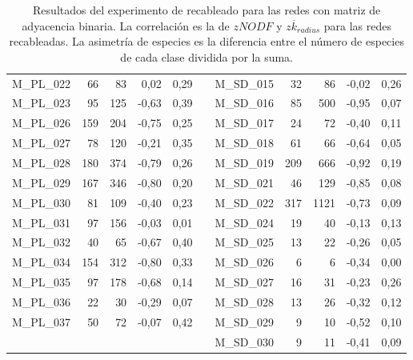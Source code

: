 \begin{table}[ht!]
\begin{tabular}{lrrrrrlrrrr}
    M\_PL\_022 & 66   & 83   & 0,02 & 0,29 &      & M\_SD\_015 & 32   & 86   & -0,02 & 0,26 \\
    M\_PL\_023 & 95   & 125  & -0,63 & 0,39 &      & M\_SD\_016 & 85   & 500  & -0,95 & 0,07 \\
    M\_PL\_026 & 159  & 204  & -0,75 & 0,25 &      & M\_SD\_017 & 24   & 72   & -0,40 & 0,11 \\
    M\_PL\_027 & 78   & 120  & -0,21 & 0,35 &      & M\_SD\_018 & 61   & 66   & -0,64 & 0,05 \\
    M\_PL\_028 & 180  & 374  & -0,79 & 0,26 &      & M\_SD\_019 & 209  & 666  & -0,92 & 0,19 \\
    M\_PL\_029 & 167  & 346  & -0,80 & 0,20 &      & M\_SD\_021 & 46   & 129  & -0,85 & 0,08 \\
    M\_PL\_030 & 81   & 109  & -0,40 & 0,23 &      & M\_SD\_022 & 317  & 1121 & -0,73 & 0,09 \\
    M\_PL\_031 & 97   & 156  & -0,03 & 0,01 &      & M\_SD\_024 & 19   & 40   & -0,13 & 0,13 \\
    M\_PL\_032 & 40   & 65   & -0,67 & 0,40 &      & M\_SD\_025 & 13   & 22   & -0,26 & 0,05 \\
    M\_PL\_034 & 154  & 312  & -0,80 & 0,33 &      & M\_SD\_026 & 6    & 6    & -0,34 & 0,00 \\
    M\_PL\_035 & 97   & 178  & -0,68 & 0,14 &      & M\_SD\_027 & 16   & 31   & -0,23 & 0,26 \\
    M\_PL\_036 & 22   & 30   & -0,29 & 0,07 &      & M\_SD\_028 & 13   & 26   & -0,32 & 0,12 \\
    M\_PL\_037 & 50   & 72   & -0,07 & 0,42 &      & M\_SD\_029 & 9    & 10   & -0,52 & 0,10 \\
         &      &      &      &      &      & M\_SD\_030 & 9    & 11   & -0,41 & 0,09 \\
    \bottomrule
    \end{tabular}%
    \caption{\label{table:table_results_recableados} Resultados del experimento de recableado para las redes con matriz de adyacencia binaria. La correlación es la de $zNODF$ y $z \overline {k}_{radius}$ para las redes recableadas. La asimetría de especies es la diferencia entre el número de especies de cada clase dividida por la suma.}
\end{table}%